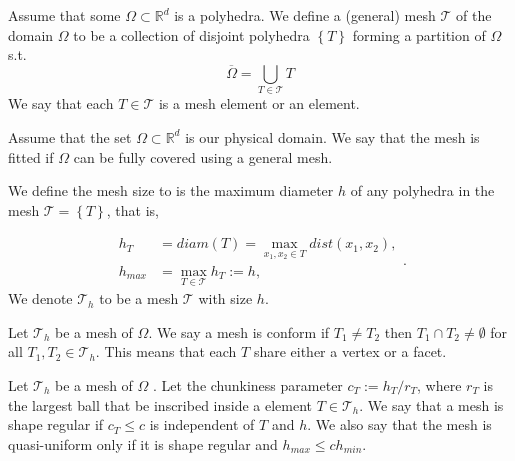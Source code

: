 \begin{definition}[Mesh]
   Assume that some $\Omega \subset \mathbb{R} ^{d} $ is a polyhedra.
    We define a (general) mesh $\mathcal{T} $ of the domain $\Omega $ to be a collection of disjoint polyhedra $\left\{ T \right\}  $ forming a partition of $\Omega $ s.t.\[
    \overline{\Omega } = \bigcup _{T \in \mathcal{T} } T
    \]
    We say that each $T \in  \mathcal{T} $ is a mesh element or an element.
\end{definition}

\begin{definition}
   Assume that the set $\Omega \subset \mathbb{R} ^{d} $ is our physical domain.
   We say that the mesh is fitted if $\Omega $ can be fully covered using a general mesh.
\end{definition}

\begin{definition}
We define the mesh size to is the maximum diameter $h $ of any polyhedra in the mesh $\mathcal{T} = \left\{ T \right\}  $, that is,

\begin{equation}
\begin{split}
    h _{T} & = diam\left( T \right)   = \max_{x_1, x_{2} \in T} dist(x_{1}, x_{2}),  \\
    h_{max} &= \max_{T \in \mathcal{T} }  h_{T} := h,
\end{split}
.\end{equation}
We denote $\mathcal{T} _{h}$ to be a mesh $\mathcal{T} $ with size $h$.
\end{definition}

\begin{definition}
Let $\mathcal{T}_{h} $ be a mesh of $\Omega $. We say a mesh is conform if $T_{1} \neq T_{2 }$  then $T_{1} \cap T_{2} \neq \emptyset  $ for all $T_{1}, T_{2} \in \mathcal{T}_{h}$. This means that each $T$ share either a vertex or a facet.
\end{definition}

\begin{definition}
Let $\mathcal{T}_{h} $ be a mesh of $\Omega $ .
Let the chunkiness parameter $c_{T} := h_{T}/r_{T}$, where $r_{T}$  is the largest ball that be inscribed inside a element $T \in \mathcal{T}_{h} $.
We say that a mesh is shape regular if $c_{T}\le  c$ is independent of $T$  and $h$. We also say that the mesh is quasi-uniform only if it is shape regular and $h_{max} \le  c h_{min}$.
\end{definition}

